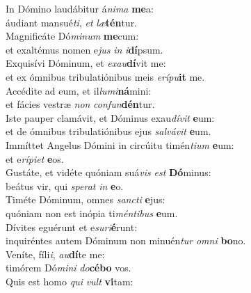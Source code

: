 \evenverse In Dómino laudábitur á\textit{ni}\textit{ma} \textbf{me}a:~\*\\
\evenverse áudiant mansué\textit{ti}, \textit{et} \textit{læ}\textbf{tén}tur.\\
\oddverse Magnificáte Dó\textit{mi}\textit{num} \textbf{me}cum:~\*\\
\oddverse et exaltémus nomen e\textit{jus} \textit{in} \textit{i}\textbf{dí}psum.\\
\evenverse Exquisívi Dóminum, et \textit{e}\textit{xau}\textbf{dí}vit me:~\*\\
\evenverse et ex ómnibus tribulatiónibus meis \textit{e}\textit{rí}\textit{pu}\textbf{it} me.\\
\oddverse Accédite ad eum, et il\textit{lu}\textit{mi}\textbf{ná}mini:~\*\\
\oddverse et fácies vestræ \textit{non} \textit{con}\textit{fun}\textbf{dén}tur.\\
\evenverse Iste pauper clamávit, et Dóminus exau\textit{dí}\textit{vit} \textbf{e}um:~\*\\
\evenverse et de ómnibus tribulatiónibus ejus \textit{sal}\textit{vá}\textit{vit} \textbf{e}um.\\
\oddverse Immíttet Angelus Dómini in circúitu timén\textit{ti}\textit{um} \textbf{e}um:~\*\\
\oddverse et e\textit{rí}\textit{pi}\textit{et} \textbf{e}os.\\
\evenverse Gustáte, et vidéte quóniam suá\textit{vis} \textit{est} \textbf{Dó}minus:~\*\\
\evenverse beátus vir, qui \textit{spe}\textit{rat} \textit{in} \textbf{e}o.\\
\oddverse Timéte Dóminum, omnes \textit{san}\textit{cti} \textbf{e}jus:~\*\\
\oddverse quóniam non est inópia ti\textit{mén}\textit{ti}\textit{bus} \textbf{e}um.\\
\evenverse Dívites eguérunt et e\textit{su}\textit{ri}\textbf{é}runt:~\*\\
\evenverse inquiréntes autem Dóminum non minuén\textit{tur} \textit{om}\textit{ni} \textbf{bo}no.\\
\oddverse Veníte, fíli\textit{i}, \textit{au}\textbf{dí}te me:~\*\\
\oddverse timórem Dó\textit{mi}\textit{ni} \textit{do}\textbf{cé}\textbf{bo} vos.\\
\evenverse Quis est homo \textit{qui} \textit{vult} \textbf{vi}tam:~\*\\
